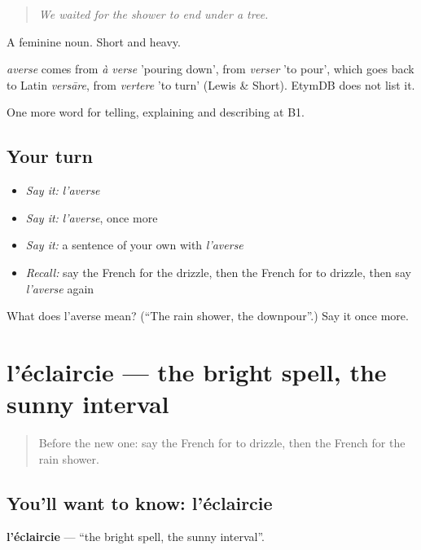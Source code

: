 \begin{quote}
\emph{We waited for the shower to end under a tree.}
\end{quote}

A feminine noun. Short and heavy.

\begin{cousinweb}
\emph{averse} comes from \emph{à verse} 'pouring down', from \emph{verser} 'to pour', which goes back to Latin \emph{versāre}, from \emph{vertere} 'to turn' (Lewis \& Short). EtymDB does not list it.
\end{cousinweb}

\begin{grammarlens}[title={What you've built}]
One more word for telling, explaining and describing at B1.
\end{grammarlens}

\subsection*{Your turn}
\begin{itemize}
\raggedright
  \item \emph{Say it:} \emph{l'averse}
  \item \emph{Say it:} \emph{l'averse}, once more
  \item \emph{Say it:} a sentence of your own with \emph{l'averse}
  \item \emph{Recall:} say the French for the drizzle, then the French for to drizzle, then say \emph{l'averse} again
\end{itemize}

\begin{tcolorbox}[breakable,colback=teal!4,colframe=teal!35!black,title={Before you move on}]
What does l'averse mean? (\textquotedblleft{}The rain shower, the downpour\textquotedblright{}.) Say it once more.
\end{tcolorbox}
\section[l'éclaircie]{l'éclaircie — the bright spell, the sunny interval}

\label{lesson:FR-C461-eclaircie}



\begin{quote}
Before the new one: say the French for to drizzle, then the French for the rain shower.
\end{quote}

\subsection*{You'll want to know: l'éclaircie}
\textbf{l'éclaircie} — \textquotedblleft{}the bright spell, the sunny interval\textquotedblright{}.

